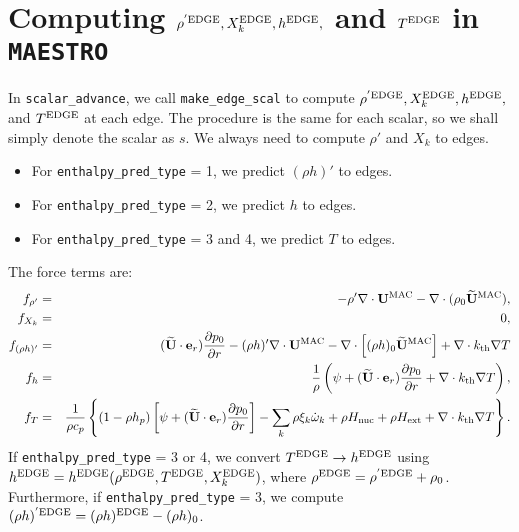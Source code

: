 \documentclass[11pt]{article}
\def\kth   {k_{\rm th}}
\def\edge  {\rm EDGE}
\def\mac   {\rm MAC}
\def\eb    {{\bf e}}
\def\Ub    {{\bf U}}
\def\Ubt   {\widetilde{\bf U}}
\begin{document}
\section{Computing $\rho^{'\edge}, X_k^{\edge}, h^{\edge},$ and $T^{\edge}$ in {\tt MAESTRO}}
In {\tt scalar\_advance}, we call {\tt make\_edge\_scal} to compute $\rho^{'\edge}, X_k^{\edge}, h^{\edge},$ and $T^{\edge}$ at each edge.  The procedure is the same for each scalar, so we shall simply denote the scalar as $s$.  We always need to compute $\rho'$ and $X_k$ to edges.
\begin{itemize}
\item For {\tt enthalpy\_pred\_type} = 1, we predict $(\rho h)'$ to edges.
\item For {\tt enthalpy\_pred\_type} = 2, we predict $h$ to edges.
\item For {\tt enthalpy\_pred\_type} = 3 and 4, we predict $T$ to edges.
\end{itemize}
The force terms are:
\begin{eqnarray}
f_{\rho'} &=& -\rho'\nabla\cdot\Ub^{\mac} - \nabla\cdot(\rho_0\Ubt^{\mac}), \\
f_{X_k} &=& 0, \\
f_{(\rho h)'} &=& (\Ubt\cdot\eb_r)\frac{\partial p_0}{\partial r} -(\rho h)'\nabla\cdot\Ub^{\mac} - \nabla\cdot\left[(\rho h)_0\Ubt^{\mac}\right] + \nabla\cdot\kth\nabla T \\
f_h &=& \frac{1}{\rho}\left(\psi + (\Ubt\cdot\eb_r)\frac{\partial p_0}{\partial r} + \nabla\cdot\kth\nabla T \right), \\
f_T &=& \frac{1}{\rho c_p}\left\{(1-\rho h_p)\left[\psi + (\Ubt\cdot\eb_r)\frac{\partial p_0}{\partial r}\right] - \sum_k\rho\xi_k\dot\omega_k + \rho H_{\rm nuc} + \rho H_{\rm ext} + \nabla\cdot\kth\nabla T \right\}.\nonumber \\
\end{eqnarray}
If {\tt enthalpy\_pred\_type} = 3 or 4, we convert $T^{\edge}\rightarrow h^{\edge}$ using $h^{\edge} = h^{\edge}(\rho^{\edge},T^{\edge},X_k^{\edge})$, where $\rho^{\edge} = \rho^{'\edge} + \rho_0$.  Furthermore, if {\tt enthalpy\_pred\_type} = 3, we compute $(\rho h)^{'\edge} = (\rho h)^{\edge} - (\rho h)_0$.
\end{document}
